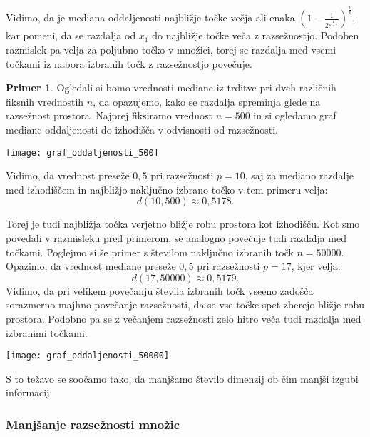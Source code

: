 \documentclass[12pt,a4paper,twoside]{article}
\theoremstyle{definition} %
\newtheorem{primer}[definicija]{Primer}
\theoremstyle{plain} %
\numberwithin{equation}{section}  %
\begin{document}
Vidimo, da je mediana oddaljenosti najbližje točke večja ali enaka $(1 - \frac{1}{2^{\frac{1}{n-1}}})^{\frac{1}{p}}$, kar pomeni, 
da se razdalja od $x_1$ do najbližje točke veča z razsežnostjo. 
Podoben razmislek pa velja za poljubno točko v množici, torej se razdalja med vsemi točkami iz nabora izbranih točk z razsežnostjo povečuje.

\begin{primer}
Ogledali si bomo vrednosti mediane iz trditve pri dveh različnih fiksnih vrednostih $n$, da opazujemo, kako se razdalja spreminja glede na razsežnost prostora. Najprej fiksiramo vrednost $n=500$ in si ogledamo graf mediane oddaljenosti do izhodišča v odvisnosti od razsežnosti.

\begin{center}
\texttt{[image: graf\_oddaljenosti\_500]}
\end{center}

Vidimo, da vrednost preseže $0,5$ pri razsežnosti $p=10$, saj za mediano razdalje med izhodiščem in najbližjo naključno izbrano točko v tem primeru velja:
\[
d(10,500) \approx 0,5178.
\]

Torej je tudi najbližja točka verjetno bližje robu prostora kot izhodišču. 
Kot smo povedali v razmisleku pred primerom, se analogno povečuje tudi razdalja med točkami. 
Poglejmo si še primer s številom naključno izbranih točk $n=50000$. Opazimo, da vrednost mediane preseže $0,5$ pri razsežnosti $p=17$, kjer velja:
\[
d(17,50000) \approx 0,5179.
\]
Vidimo, da pri velikem povečanju števila izbranih točk vseeno zadošča sorazmerno majhno povečanje razsežnosti, da se vse točke spet zberejo bližje robu prostora. 
Podobno pa se z večanjem razsežnosti zelo hitro veča tudi razdalja med izbranimi točkami.

\begin{center}
\texttt{[image: graf\_oddaljenosti\_50000]}
\end{center}

\end{primer}

S to težavo se soočamo tako, da manjšamo število dimenzij ob čim manjši izgubi informacij.


\subsubsection{Manjšanje razsežnosti množic}
\end{document}
